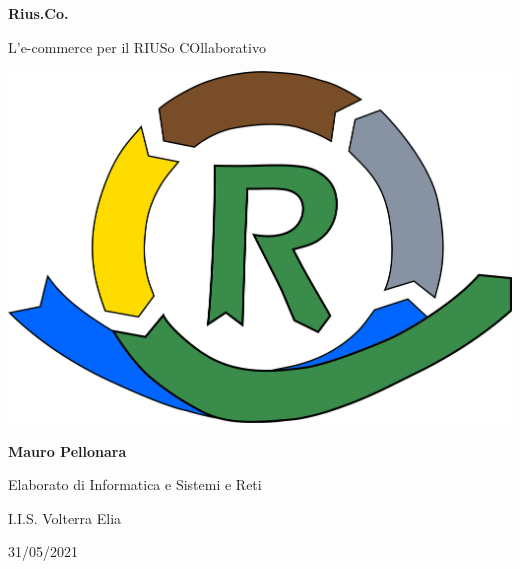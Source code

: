 \documentclass[italian, a4paper, 12pt]{article}
\begin{document}
\begin{titlepage}
    \begin{center}
        \vspace*{1cm}
        
        \textbf{\Huge Rius.Co.}

        \vspace{1cm}

        {\LARGE L'e-commerce per il RIUSo COllaborativo}

        \vfill

        {\includegraphics[scale=.42]{images/logo.png}}

        \vfill

        \textbf{\Large Mauro Pellonara}
        
        \vspace{1cm}
        
        {\large Elaborato di Informatica e Sistemi e Reti}
        
        \vspace{0.3cm}

        {\large I.I.S. Volterra Elia}
        
        \vspace{0.3cm}
        
        {\large 31/05/2021}
    \end{center}
\end{titlepage}

\tableofcontents
\newpage


\clearpage

\clearpage

\clearpage

\clearpage

\clearpage

\clearpage

\end{document}
